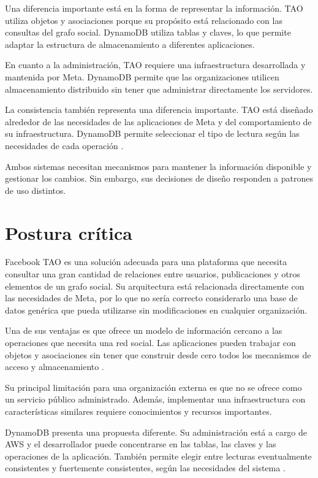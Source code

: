 \documentclass[12pt,a4paper]{article}
\begin{document}
Una diferencia importante está en la forma de representar la información. TAO utiliza objetos y asociaciones porque su propósito está relacionado con las consultas del grafo social. DynamoDB utiliza tablas y claves, lo que permite adaptar la estructura de almacenamiento a diferentes aplicaciones.

En cuanto a la administración, TAO requiere una infraestructura desarrollada y mantenida por Meta. DynamoDB permite que las organizaciones utilicen almacenamiento distribuido sin tener que administrar directamente los servidores.

La consistencia también representa una diferencia importante. TAO está diseñado alrededor de las necesidades de las aplicaciones de Meta y del comportamiento de su infraestructura. DynamoDB permite seleccionar el tipo de lectura según las necesidades de cada operación \cite{awsdynamodbconsistency}.

Ambos sistemas necesitan mecanismos para mantener la información disponible y gestionar los cambios. Sin embargo, sus decisiones de diseño responden a patrones de uso distintos.

\section{Postura crítica}

Facebook TAO es una solución adecuada para una plataforma que necesita consultar una gran cantidad de relaciones entre usuarios, publicaciones y otros elementos de un grafo social. Su arquitectura está relacionada directamente con las necesidades de Meta, por lo que no sería correcto considerarlo una base de datos genérica que pueda utilizarse sin modificaciones en cualquier organización.

Una de sus ventajas es que ofrece un modelo de información cercano a las operaciones que necesita una red social. Las aplicaciones pueden trabajar con objetos y asociaciones sin tener que construir desde cero todos los mecanismos de acceso y almacenamiento \cite{bronson2013tao}.

Su principal limitación para una organización externa es que no se ofrece como un servicio público administrado. Además, implementar una infraestructura con características similares requiere conocimientos y recursos importantes.

DynamoDB presenta una propuesta diferente. Su administración está a cargo de AWS y el desarrollador puede concentrarse en las tablas, las claves y las operaciones de la aplicación. También permite elegir entre lecturas eventualmente consistentes y fuertemente consistentes, según las necesidades del sistema \cite{awsdynamodbconsistency}.
\end{document}
